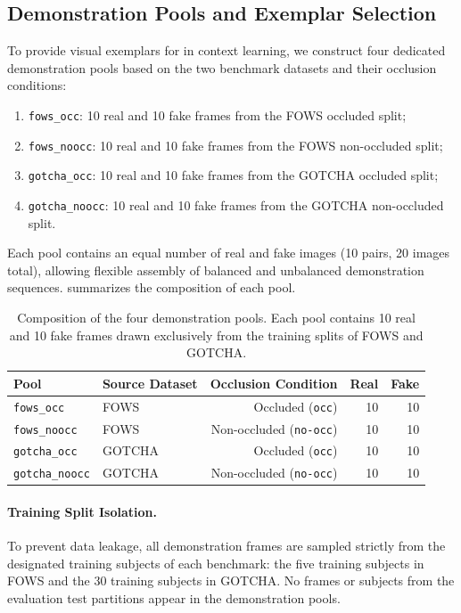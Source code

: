 \subsection{Demonstration Pools and Exemplar Selection}
\label{subsec:fewshot_pools}

To provide visual exemplars for in context learning, we construct four dedicated demonstration pools based on the two benchmark datasets and their occlusion conditions:
\begin{enumerate}
    \item \texttt{fows\_occ}: 10 real and 10 fake frames from the FOWS occluded split;
    \item \texttt{fows\_noocc}: 10 real and 10 fake frames from the FOWS non-occluded split;
    \item \texttt{gotcha\_occ}: 10 real and 10 fake frames from the GOTCHA occluded split;
    \item \texttt{gotcha\_noocc}: 10 real and 10 fake frames from the GOTCHA non-occluded split.
\end{enumerate}
Each pool contains an equal number of real and fake images (10 pairs, 20 images total), allowing flexible assembly of balanced and unbalanced demonstration sequences.  summarizes the composition of each pool.

\begin{table}[t]
	\centering
	\caption{Composition of the four demonstration pools. Each pool contains 10 real and 10 fake frames drawn exclusively from the training splits of FOWS and GOTCHA.}
	\label{tab:demo_pools}
	\begin{tabular}{llrrr}
		\toprule
		\textbf{Pool} & \textbf{Source Dataset} & \textbf{Occlusion Condition} & \textbf{Real} & \textbf{Fake} \\
		\midrule
		\texttt{fows\_occ}     & FOWS   & Occluded (\texttt{occ})         & \num{10} & \num{10} \\
		\texttt{fows\_noocc}   & FOWS   & Non-occluded (\texttt{no-occ})  & \num{10} & \num{10} \\
		\texttt{gotcha\_occ}   & GOTCHA & Occluded (\texttt{occ})         & \num{10} & \num{10} \\
		\texttt{gotcha\_noocc} & GOTCHA & Non-occluded (\texttt{no-occ})  & \num{10} & \num{10} \\
		\bottomrule
	\end{tabular}
\end{table}

\paragraph{Training Split Isolation.}
To prevent data leakage, all demonstration frames are sampled strictly from the designated training subjects of each benchmark: the five training subjects in FOWS and the 30 training subjects in GOTCHA. No frames or subjects from the evaluation test partitions appear in the demonstration pools.


